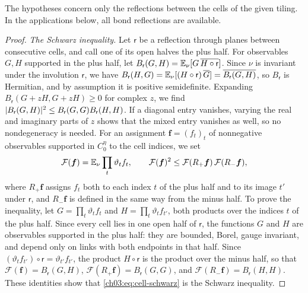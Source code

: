The hypotheses concern only the reflections between the cells of the given tiling. In the applications below, all bond reflections are available.

\begin{proof}
\emph{The Schwarz inequality.} Let $\mathsf r$ be a reflection through planes between consecutive cells, and call one of its open halves the plus half. For observables $G,H$ supported in the plus half, let $B_{\mathsf r}(G,H)=\mathbb E_\nu[G\,\overline{H\circ\mathsf r}]$. Since $\nu$ is invariant under the involution $\mathsf r$, we have $B_{\mathsf r}(H,G)=\mathbb E_\nu[(H\circ\mathsf r)\,\overline G]=\overline{B_{\mathsf r}(G,H)}$, so $B_{\mathsf r}$ is Hermitian, and by assumption it is positive semidefinite. Expanding $B_{\mathsf r}(G+zH,G+zH)\ge0$ for complex $z$, we find $\lvert B_{\mathsf r}(G,H)\rvert^2\le B_{\mathsf r}(G,G)B_{\mathsf r}(H,H)$. If a diagonal entry vanishes, varying the real and imaginary parts of $z$ shows that the mixed entry vanishes as well, so no nondegeneracy is needed. For an assignment $\boldsymbol f=(f_t)_t$ of nonnegative observables supported in $C^\eta_0$ to the cell indices, we set
\begin{equation}\label{ch03:eq:cell-schwarz}
 \mathcal F(\boldsymbol f)=\mathbb E_\nu\prod_t\vartheta_tf_t,\qquad \mathcal F(\boldsymbol f)^2\le\mathcal F(R_+\boldsymbol f)\,\mathcal F(R_-\boldsymbol f),
\end{equation}
where $R_+\boldsymbol f$ assigns $f_t$ both to each index $t$ of the plus half and to its image $t'$ under $\mathsf r$, and $R_-\boldsymbol f$ is defined in the same way from the minus half. To prove the inequality, let $G=\prod_t\vartheta_tf_t$ and $H=\prod_t\vartheta_tf_{t'}$, both products over the indices $t$ of the plus half. Since every cell lies in one open half of $\mathsf r$, the functions $G$ and $H$ are observables supported in the plus half: they are bounded, Borel, gauge invariant, and depend only on links with both endpoints in that half. Since $(\vartheta_tf_{t'})\circ\mathsf r=\vartheta_{t'}f_{t'}$, the product $H\circ\mathsf r$ is the product over the minus half, so that $\mathcal F(\boldsymbol f)=B_{\mathsf r}(G,H)$, $\mathcal F(R_+\boldsymbol f)=B_{\mathsf r}(G,G)$, and $\mathcal F(R_-\boldsymbol f)=B_{\mathsf r}(H,H)$. These identities show that \eqref{ch03:eq:cell-schwarz} is the Schwarz inequality.


\end{proof}
